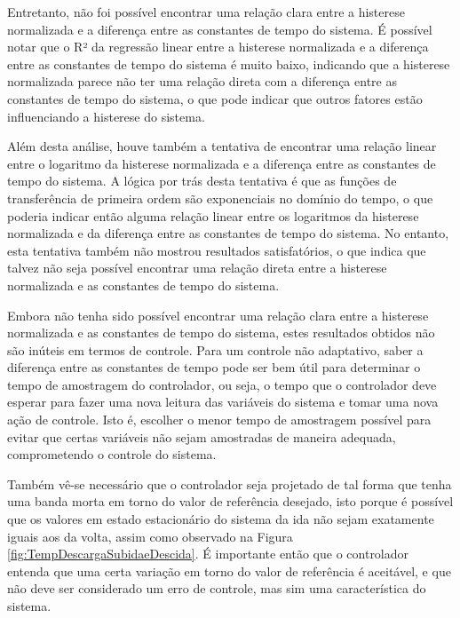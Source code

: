 Entretanto, não foi possível encontrar uma relação clara entre a histerese normalizada e a diferença entre as constantes de tempo do sistema. É possível notar que o R² da regressão linear entre a histerese normalizada e a diferença entre as constantes de tempo do sistema é muito baixo, indicando que a histerese normalizada parece não ter uma relação direta com a diferença entre as constantes de tempo do sistema, o que pode indicar que outros fatores estão influenciando a histerese do sistema.

Além desta análise, houve também a tentativa de encontrar uma relação linear entre o logaritmo da histerese normalizada e a diferença entre as constantes de tempo do sistema. A lógica por trás desta tentativa é que as funções de transferência de primeira ordem são exponenciais no domínio do tempo, o que poderia indicar então alguma relação linear entre os logaritmos da histerese normalizada e da diferença entre as constantes de tempo do sistema. No entanto, esta tentativa também não mostrou resultados satisfatórios, o que indica que talvez não seja possível encontrar uma relação direta entre a histerese normalizada e as constantes de tempo do sistema. 

Embora não tenha sido possível encontrar uma relação clara entre a histerese normalizada e as constantes de tempo do sistema, estes resultados obtidos não são inúteis em termos de controle.
Para um controle não adaptativo, saber a diferença entre as constantes de tempo pode ser bem útil para determinar o tempo de amostragem do controlador, ou seja, o tempo que o controlador deve esperar para fazer uma nova leitura das variáveis do sistema e tomar uma nova ação de controle. Isto é, escolher o menor tempo de amostragem possível para evitar que certas variáveis não sejam amostradas de maneira adequada, comprometendo o controle do sistema.

Também vê-se necessário que o controlador seja projetado de tal forma que tenha uma banda morta em torno do valor de referência desejado, isto porque é possível que os valores em estado estacionário do sistema da ida não sejam exatamente iguais aos da volta, assim como observado na Figura \ref{fig:TempDescargaSubidaeDescida}. É importante então que o controlador entenda que uma certa variação em torno do valor de referência é aceitável, e que não deve ser considerado um erro de controle, mas sim uma característica do sistema.

